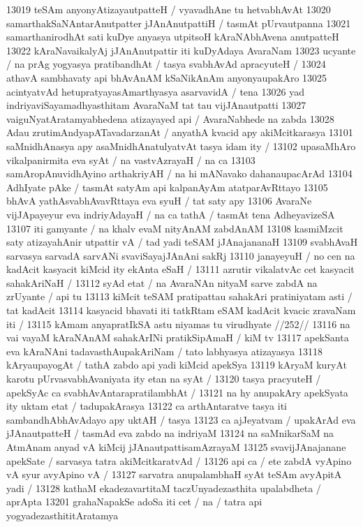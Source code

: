 13019 teSAm anyonyAtizayautpatteH / vyavadhAne tu hetvabhAvAt  
13020 samarthakSaNAntarAnutpatter jJAnAnutpattiH / tasmAt pUrvautpanna
13021 samarthanirodhAt sati kuDye anyasya utpitsoH kAraNAbhAvena anutpatteH
13022 kAraNavaikalyAj jJAnAnutpattir iti kuDyAdaya AvaraNam  
13023 ucyante / na prAg yogyasya pratibandhAt / tasya svabhAvAd apracyuteH /
13024 athavA sambhavaty api bhAvAnAM kSaNikAnAm anyonyaupakAro 
13025 acintyatvAd hetupratyayasAmarthyasya asarvavidA / tena
13026 yad indriyaviSayamadhyasthitam AvaraNaM tat tau vijJAnautpatti  
13027 vaiguNyatAratamyabhedena atizayayed api / AvaraNabhede na zabda  
13028 Adau zrutimAndyapATavadarzanAt / anyathA kvacid apy akiMcitkarasya
13101 	saMnidhAnasya apy asaMnidhAnatulyatvAt tasya idam ity /
13102 upasaMhAro vikalpanirmita eva syAt / na vastvAzrayaH / na ca
13103 samAropAnuvidhAyino arthakriyAH / na hi mANavako dahanaupacArAd  
13104 AdhIyate pAke / tasmAt satyAm api kalpanAyAm atatparAvRttayo  
13105 bhAvA yathAsvabhAvavRttaya eva syuH / tat saty apy
13106 AvaraNe vijJApayeyur eva indriyAdayaH / na ca tathA / tasmAt tena AdheyavizeSA
13107 iti gamyante / na khalv evaM nityAnAM zabdAnAM
13108 kasmiMzcit saty atizayahAnir utpattir vA / tad yadi teSAM jJAnajananaH
13109 svabhAvaH sarvasya sarvadA sarvANi svaviSayajJAnAni sakRj 
13110 janayeyuH / no cen na kadAcit kasyacit kiMcid ity ekAnta eSaH /
13111 	azrutir vikalatvAc cet kasyacit sahakAriNaH / 
13112 syAd etat / na AvaraNAn nityaM sarve zabdA na zrUyante / api tu 
13113 kiMcit teSAM pratipattau sahakAri pratiniyatam asti / tat kadAcit
13114 kasyacid bhavati iti tatkRtam eSAM kadAcit kvacic zravaNam iti / 
13115 	kAmam anyapratIkSA astu niyamas tu virudhyate //252//
13116 na vai vayaM kAraNAnAM sahakArINi pratikSipAmaH / kiM tv
13117 apekSanta eva kAraNAni tadavasthAupakAriNam / tato labhyasya atizayasya
13118 kAryaupayogAt / tathA zabdo api yadi kiMcid apekSya 
13119 kAryaM kuryAt karotu pUrvasvabhAvaniyata ity etan na syAt /  
13120 tasya pracyuteH / apekSyAc ca svabhAvAntarapratilambhAt /  
13121 na hy anupakAry apekSyata ity uktam etat / tadupakArasya
13122 ca arthAntaratve tasya iti sambandhAbhAvAdayo apy uktAH / tasya
13123 ca ajJeyatvam / upakArAd eva jJAnautpatteH / tasmAd eva zabdo na indriyaM
13124 na saMnikarSaM na AtmAnam anyad vA kiMcij jJAnautpattisamAzrayaM
13125 svavijJAnajanane apekSate / sarvasya tatra akiMcitkaratvAd / 
13126 api ca / ete zabdA vyApino vA syur avyApino vA /
13127 	sarvatra anupalambhaH syAt teSAm avyApitA yadi /  
13128 	kathaM ekadezavartitaM taczUnyadezasthita upalabdheta / aprApta
13201 grahaNapakSe adoSa iti cet / na / tatra api yogyadezasthititAratamya
